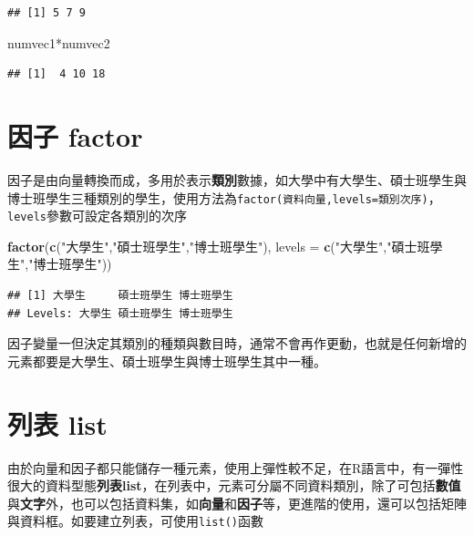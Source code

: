 \documentclass[]{book}
\newenvironment{Shaded}{\begin{snugshade}}{\end{snugshade}}
\newcommand{\KeywordTok}[1]{\textcolor[rgb]{0.13,0.29,0.53}{\textbf{{#1}}}}
\newcommand{\DataTypeTok}[1]{\textcolor[rgb]{0.13,0.29,0.53}{{#1}}}
\newcommand{\StringTok}[1]{\textcolor[rgb]{0.31,0.60,0.02}{{#1}}}
\newcommand{\NormalTok}[1]{{#1}}
\theoremstyle{definition}
\theoremstyle{definition}
\theoremstyle{remark}
\begin{document}
\begin{verbatim}
## [1] 5 7 9
\end{verbatim}

\begin{Shaded}
\begin{Highlighting}[]
\NormalTok{numvec1*numvec2}
\end{Highlighting}
\end{Shaded}

\begin{verbatim}
## [1]  4 10 18
\end{verbatim}

\section{因子 factor}\label{-factor}

因子是由向量轉換而成，多用於表示\textbf{類別}數據，如大學中有大學生、碩士班學生與博士班學生三種類別的學生，使用方法為\texttt{factor(資料向量,levels=類別次序)}，\texttt{levels}參數可設定各類別的次序

\begin{Shaded}
\begin{Highlighting}[]
\KeywordTok{factor}\NormalTok{(}\KeywordTok{c}\NormalTok{(}\StringTok{"大學生"}\NormalTok{,}\StringTok{"碩士班學生"}\NormalTok{,}\StringTok{"博士班學生"}\NormalTok{),}
       \DataTypeTok{levels =} \KeywordTok{c}\NormalTok{(}\StringTok{"大學生"}\NormalTok{,}\StringTok{"碩士班學生"}\NormalTok{,}\StringTok{"博士班學生"}\NormalTok{))}
\end{Highlighting}
\end{Shaded}

\begin{verbatim}
## [1] 大學生     碩士班學生 博士班學生
## Levels: 大學生 碩士班學生 博士班學生
\end{verbatim}

因子變量一但決定其類別的種類與數目時，通常不會再作更動，也就是任何新增的元素都要是大學生、碩士班學生與博士班學生其中一種。

\section{列表 list}\label{-list}

由於向量和因子都只能儲存一種元素，使用上彈性較不足，在R語言中，有一彈性很大的資料型態\textbf{列表list}，在列表中，元素可分屬不同資料類別，除了可包括\textbf{數值}與\textbf{文字}外，也可以包括資料集，如\textbf{向量}和\textbf{因子}等，更進階的使用，還可以包括矩陣與資料框。如要建立列表，可使用\texttt{list()}函數
\end{document}
